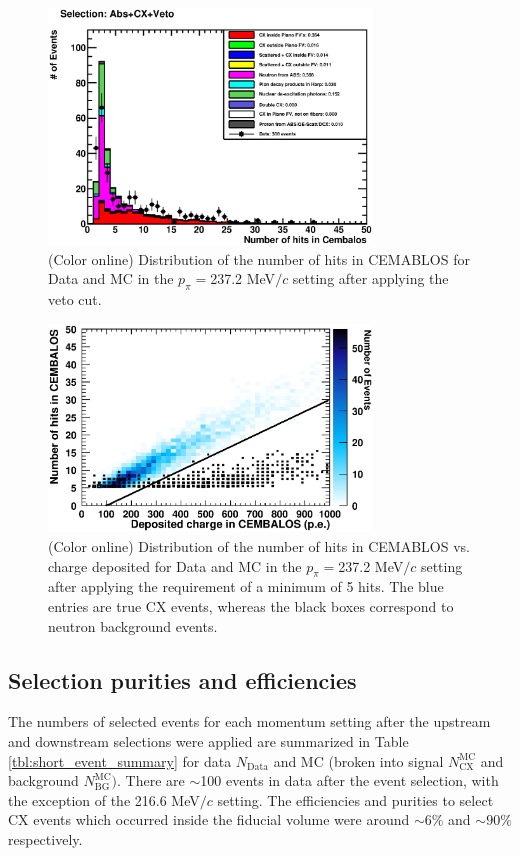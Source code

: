 \begin{figure}[ht]
 \includegraphics[width=86mm]{figures/duettag_nhits_20000.eps}
 \caption{(Color online) Distribution of the number of hits in CEMABLOS for Data and MC in the $p_\pi=$237.2 MeV$/c$ setting after applying the veto cut.}
 \label{fig:nhits}
\end{figure}

\begin{figure}[ht]
 \includegraphics[width=86mm]{figures/draw2Dcut_draw.eps}
 \caption{(Color online) Distribution of the number of hits in CEMABLOS vs. charge deposited for Data and MC in the $p_\pi=$237.2 MeV$/c$ setting after applying the requirement of a minimum of 5 hits. The blue entries are true CX events, whereas the black boxes correspond to neutron background events.}
 \label{fig:nhitsvsCharge}
\end{figure}


\subsection{Selection purities and efficiencies}
The numbers of selected events for each momentum setting after the upstream and downstream selections were applied are summarized in Table \ref{tbl:short_event_summary} for data $N_{\mathrm{Data}}$ and MC (broken into signal $N_{\mathrm{CX}}^{\mathrm{MC}}$ and background $N_{\mathrm{BG}}^{\mathrm{MC}})$. There are $\sim$100 events in data after the event selection, with the exception of the 216.6 MeV$/c$ setting. The efficiencies and purities to select CX events which occurred inside the fiducial volume were around $\sim6\%$ and $\sim90\%$ respectively.

